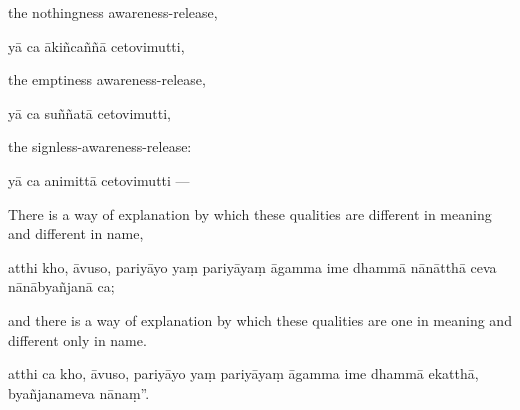 \begin{samepage}
\begin{leftcolumn*}
the nothingness awareness-release,
\end{leftcolumn*}

\begin{rightcolumn}
yā ca ākiñcaññā cetovimutti,
\end{rightcolumn}
\end{samepage}

\begin{samepage}
\begin{leftcolumn*}
the emptiness awareness-release,
\end{leftcolumn*}

\begin{rightcolumn}
yā ca suññatā cetovimutti,
\end{rightcolumn}
\end{samepage}

\begin{samepage}
\begin{leftcolumn*}
the signless-awareness-release:
\end{leftcolumn*}

\begin{rightcolumn}
yā ca animittā cetovimutti —
\end{rightcolumn}
\end{samepage}

\begin{samepage}
\begin{leftcolumn*}
There is a way of explanation by which these qualities are different in meaning and different in name,
\end{leftcolumn*}

\begin{rightcolumn}
atthi kho, āvuso, pariyāyo yaṃ pariyāyaṃ āgamma ime dhammā nānātthā ceva nānābyañjanā ca;
\end{rightcolumn}
\end{samepage}

\begin{samepage}
\begin{leftcolumn*}
and there is a way of explanation by which these qualities are one in meaning and different only in name.
\end{leftcolumn*}

\begin{rightcolumn}
atthi ca kho, āvuso, pariyāyo yaṃ pariyāyaṃ āgamma ime dhammā ekatthā, byañjanameva nānaṃ”.
\end{rightcolumn}
\end{samepage}

